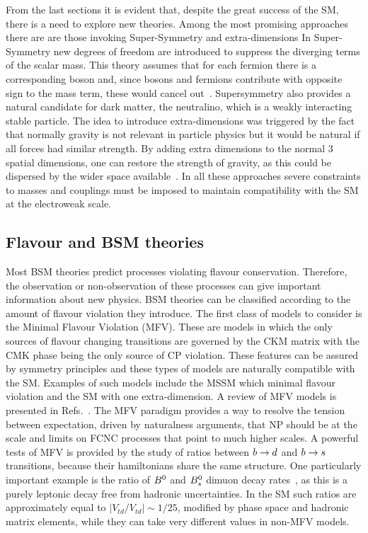 From the last sections it is evident that, despite the great success of the SM, there is a need to explore new theories. 
Among the most promising approaches there are are those invoking Super-Symmetry and extra-dimensions 
%
In Super-Symmetry new degrees of freedom are introduced to suppress the diverging terms of the scalar mass. This theory
assumes that for each fermion there is a corresponding boson and, since bosons and fermions contribute with opposite
sign to the mass term, these would cancel out~\cite{Fayet:1976cr}. Supersymmetry also provides a natural candidate for dark
matter, the neutralino, which is a weakly interacting stable particle.
%
The idea to introduce extra-dimensions was triggered by the fact that normally gravity is not relevant
in particle physics but it would be natural if all forces had similar strength. By adding extra dimensions to the normal 3 spatial dimensions, one can restore the strength of gravity, as this could be dispersed by the wider space available~\cite{Randall:1999ee}.
%
In all these approaches severe constraints to masses and couplings must be imposed to maintain
compatibility with the SM at the electroweak scale.

\subsection{Flavour and BSM theories}

Most BSM theories predict processes violating flavour conservation. Therefore, the observation or
non-observation of these processes can give important information about new physics.
BSM theories can be classified according to the amount of flavour violation they introduce.
The first class of models to consider is the Minimal Flavour Violation (MFV).
These are models in which the only sources of flavour changing transitions are governed by the
CKM matrix with the CMK phase being the only source of CP violation.
These features can be assured by symmetry principles and these types of models are
naturally compatible with the SM. Examples of such models include the MSSM
which minimal flavour violation and the SM with one extra-dimension. A review of MFV models
is presented in Refs.~\cite{Isidori:2012ts,Buras:2003jf}.
%
The MFV paradigm provides a way to resolve the tension between expectation, driven by naturalness arguments,
that NP should be at the \tev scale and limits on FCNC processes that point to much higher scales.
%
A powerful tests of MFV is provided by the study of ratios between $b\rightarrow d$ and $b\rightarrow s$
transitions, because their hamiltonians share the same structure. One particularly important example is the ratio of
$B^0$ and $B^0_s$ dimuon decay rates~\cite{TomRDreview}, as this is a purely leptonic decay free from hadronic uncertainties.
In the SM such ratios are approximately equal to $|V_{td}/V_{td}| \sim 1/25$, modified by phase space and hadronic
matrix elements, while they can take very different values in non-MFV models.

